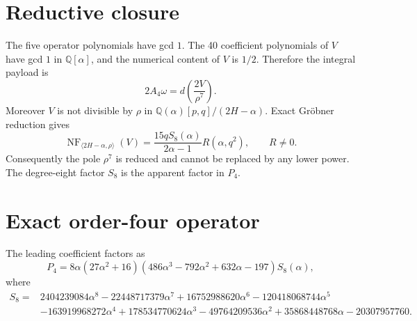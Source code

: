 \documentclass[9pt]{extarticle}
\newcommand{\QQ}{\mathbb Q}
\begin{document}
\section*{Reductive closure}
The five operator polynomials have gcd $1$. The 40 coefficient polynomials of
$V$ have gcd $1$ in $\QQ[\alpha]$, and the numerical content of $V$ is $1/2$.
Therefore the integral payload is
\[
2A_4\omega=d\left(\frac{2V}{\rho^7}\right).
\]
Moreover $V$ is not divisible by $\rho$ in
$\QQ(\alpha)[p,q]/(2H-\alpha)$. Exact Gr\"obner reduction gives
\[
\operatorname{NF}_{\langle 2H-\alpha,\rho\rangle}(V)
=\frac{15qS_8(\alpha)}{2\alpha-1}R(\alpha,q^2),\qquad R\ne0.
\]
Consequently the pole $\rho^7$ is reduced and cannot be replaced by any lower
power. The degree-eight factor $S_8$ is the apparent factor in $P_4$.

\section*{Exact order-four operator}
The leading coefficient factors as
\[
P_4=8\alpha(27\alpha^2+16)
(486\alpha^3-792\alpha^2+632\alpha-197)S_8(\alpha),
\]
where
\begin{align*}
S_8={}&2404239084\alpha^8-22448717379\alpha^7+16752988620\alpha^6
-120418068744\alpha^5\\
&-163919968272\alpha^4+178534770624\alpha^3-49764209536\alpha^2
+35868448768\alpha-20307957760.
\end{align*}
\end{document}
